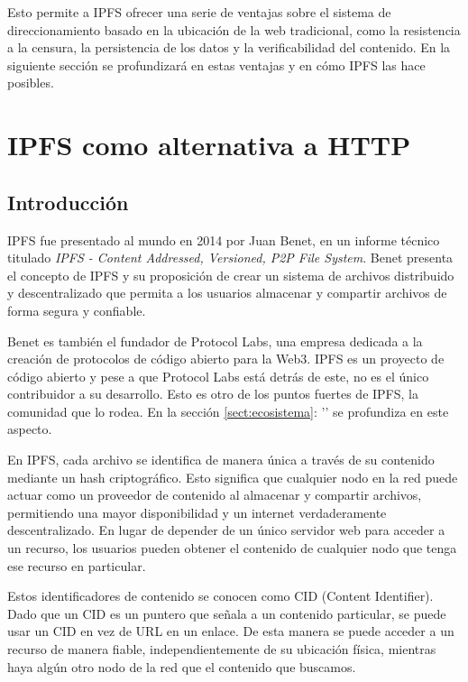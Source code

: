 Esto permite a IPFS ofrecer una serie de ventajas sobre el sistema de direccionamiento basado en la ubicación de la web
tradicional, como la resistencia a la censura, la persistencia de los datos y la verificabilidad del contenido.
En la siguiente sección se profundizará en estas ventajas y en cómo IPFS las hace posibles.

\section{IPFS como alternativa a HTTP}\label{sect:ipfs}

\subsection{Introducción}
IPFS fue presentado al mundo en 2014 por Juan Benet, en un informe técnico titulado
\textit{IPFS - Content Addressed, Versioned, P2P File System}\cite{benetIPFSContentAddressed2014}.
Benet presenta el concepto de IPFS y su proposición de crear un sistema de archivos
distribuido y descentralizado que permita a los usuarios almacenar y compartir archivos de forma segura y confiable.

Benet es también el fundador de Protocol Labs\cite{ProtocolLabs}, una empresa dedicada a la creación de protocolos de código abierto para la Web3.
IPFS es un proyecto de código abierto y pese a que Protocol Labs está detrás de este, no es el único contribuidor a su desarrollo. Esto es otro
de los puntos fuertes de IPFS, la comunidad que lo rodea. En la sección \ref{sect:ecosistema}: '' se profundiza en este aspecto.

En IPFS, cada archivo se identifica de manera única a través de su contenido mediante un hash criptográfico. Esto significa que
cualquier nodo en la red puede actuar como un proveedor de contenido al almacenar y compartir archivos, permitiendo una mayor
disponibilidad y un internet verdaderamente descentralizado. En lugar de depender de un único servidor web para acceder a un
recurso, los usuarios pueden obtener el contenido de cualquier nodo que tenga ese recurso en particular.

Estos identificadores de contenido se conocen como CID (Content Identifier). Dado que un CID es un puntero que señala a un contenido particular, se puede usar un CID en vez de URL en un enlace. De esta manera
se puede acceder a un recurso de manera fiable, independientemente de su ubicación física, mientras haya algún otro nodo de la red que el contenido que buscamos.

